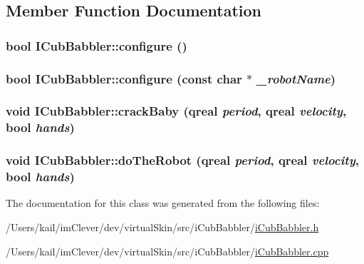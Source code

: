 \subsection{Member Function Documentation}
\hypertarget{class_i_cub_babbler_a90c2ae6f6f5a8032cc7a49e1966b2af6}{
\subsubsection[{configure}]{\setlength{\rightskip}{0pt plus 5cm}bool ICubBabbler::configure ()}}
\label{class_i_cub_babbler_a90c2ae6f6f5a8032cc7a49e1966b2af6}
\hypertarget{class_i_cub_babbler_affe4b96670efff3357f67aa26def4481}{
\subsubsection[{configure}]{\setlength{\rightskip}{0pt plus 5cm}bool ICubBabbler::configure (const char $\ast$ {\em \_\-robotName})}}
\label{class_i_cub_babbler_affe4b96670efff3357f67aa26def4481}
\hypertarget{class_i_cub_babbler_a5913a116c61504e6705d1c5de27c5324}{
\subsubsection[{crackBaby}]{\setlength{\rightskip}{0pt plus 5cm}void ICubBabbler::crackBaby (qreal {\em period}, \/  qreal {\em velocity}, \/  bool {\em hands})}}
\label{class_i_cub_babbler_a5913a116c61504e6705d1c5de27c5324}
\hypertarget{class_i_cub_babbler_a9ab1247bc5dba75476146438fe70d207}{
\subsubsection[{doTheRobot}]{\setlength{\rightskip}{0pt plus 5cm}void ICubBabbler::doTheRobot (qreal {\em period}, \/  qreal {\em velocity}, \/  bool {\em hands})}}
\label{class_i_cub_babbler_a9ab1247bc5dba75476146438fe70d207}


The documentation for this class was generated from the following files:\begin{DoxyCompactItemize}
\item 
/Users/kail/imClever/dev/virtualSkin/src/iCubBabbler/\hyperlink{i_cub_babbler_8h}{iCubBabbler.h}\item 
/Users/kail/imClever/dev/virtualSkin/src/iCubBabbler/\hyperlink{i_cub_babbler_8cpp}{iCubBabbler.cpp}\end{DoxyCompactItemize}
